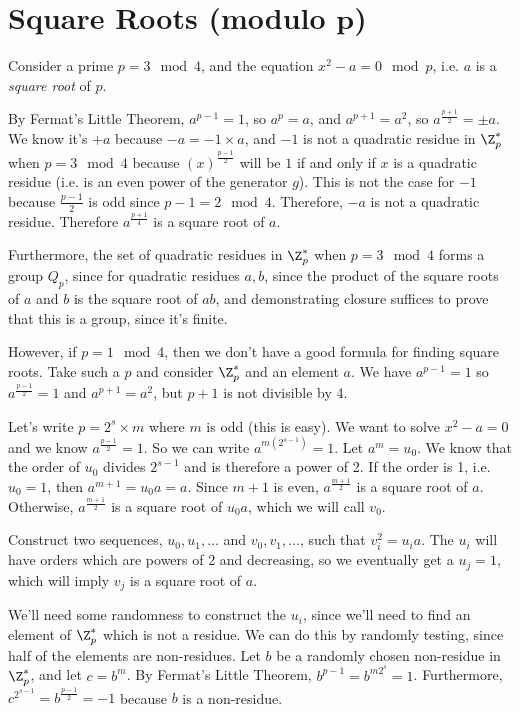 
\section{Square Roots (modulo $\boldsymbol{p}$)}
	
	Consider a prime $p=3\mod 4$, and the equation $x^2-a=0\mod p$, i.e. $a$ is a \textit{square root} of $p$.
	
	By Fermat's Little Theorem, $a^{p-1}=1$, so $a^{p}=a$, and $a^{p+1} = a^2$, so $a^{\frac{p+1}{2}} = \pm a$.  We know it's $+a$ because $-a = -1 \times a$, and $-1$ is not a quadratic residue in $\Z_p^*$ when $p=3\mod 4$ because $(x)^\frac{p-1}{2}$ will be $1$ if and only if $x$ is a quadratic residue (i.e. is an even power of the generator $g$).  This is not the case for $-1$ because $\frac{p-1}{2}$ is odd since $p-1 = 2\mod 4$. Therefore, $-a$ is not a quadratic residue. Therefore $a^\frac{p+1}{4}$ is a square root of $a$.
	
	Furthermore, the set of quadratic residues in $\Z_p^*$ when $p=3\mod 4$ forms a group $Q_p$, since for quadratic residues $a,b$, since the product of the square roots of $a$ and $b$ is the square root of $ab$, and demonstrating closure suffices to prove that this is a group, since it's finite.  
	
	However, if $p=1\mod 4$, then we don't have a good formula for finding square roots.  Take such a $p$ and consider $\Z_p^*$ and an element $a$.  We have $a^{p-1}=1$ so $a^\frac{p-1}{2} = 1$ and $a^{p+1} = a^2$, but $p+1$ is not divisible by 4.
	
	Let's write $p=2^s\times m$ where $m$ is odd (this is easy).  We want to solve $x^2-a=0$ and we know $a^\frac{p-1}{2}=1$.  So we can write $a^{m(2^{s-1})} = 1$.  Let $a^m=u_0$.  We know that the order of $u_0$ divides $2^{s-1}$ and is therefore a power of 2.  If the order is 1, i.e. $u_0=1$, then $a^{m+1} = u_0a = a$.  Since $m+1$ is even, $a^\frac{m+1}{2}$ is a square root of $a$.  Otherwise, $a^\frac{m+1}{2}$ is a square root of $u_0a$, which we will call $v_0$.
	
	Construct two sequences, $u_0,u_1,\dots$ and $v_0,v_1,\dots$, such that $v_i^2 = u_ia$.  The $u_i$ will have orders which are powers of 2 and decreasing, so we eventually get a $u_j=1$, which will imply $v_j$ is a square root of $a$.
	
	We'll need some randomness to construct the $u_i$, since we'll need to find an element of $\Z_p^*$ which is not a residue.  We can do this by randomly testing, since half of the elements are non-residues.  Let $b$ be a randomly chosen non-residue in $\Z_p^*$, and let $c=b^m$.  By Fermat's Little Theorem, $b^{p-1}=b^{m2^s}=1$.  Furthermore, $c^{2^{s-1}} = b^\frac{p-1}{2} = -1$ because $b$ is a non-residue.
	
